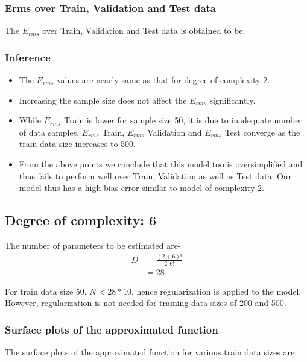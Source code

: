 \documentclass[12pt,a4paper]{article}
\newcommand{\noi}{\noindent}
\begin{document}
\subsubsection{Erms over Train, Validation and Test data}
The $E_{rms}$ over Train, Validation and Test data is obtained to be:


\subsubsection{Inference}
\begin{itemize}
    \itemsep0em
    \item The $E_{rms}$ values are nearly same as that for degree of complexity 2.
    \item Increasing the sample size does not affect the $E_{rms}$ significantly.
    \item While $E_{rms}$ Train is lower for sample size 50, it is due to inadequate number of data samples. $E_{rms}$ Train, $E_{rms}$ Validation and $E_{rms}$ Test converge as the train data size increases to 500.
    \item From the above points we conclude that this model too is oversimplified and thus fails to perform well over Train, Validation as well as Test data. Our model thus has a high bias error similar to model of complexity 2. 
\end{itemize}

\subsection{Degree of complexity: 6}
The number of parameters to be estimated are-
\begin{equation}
    \begin{split}
        D&=\frac{(2+6)!}{2!\,6!} \\
        &=28
    \end{split}
\end{equation}

\noi
For train data size 50, $N<28*10$, hence regularization is applied to the model. However, regularization is not needed for training data sizes of 200 and 500. 

\subsubsection{Surface plots of the approximated function}
The surface plots of the approximated function for various train data sizes are:
\end{document}
